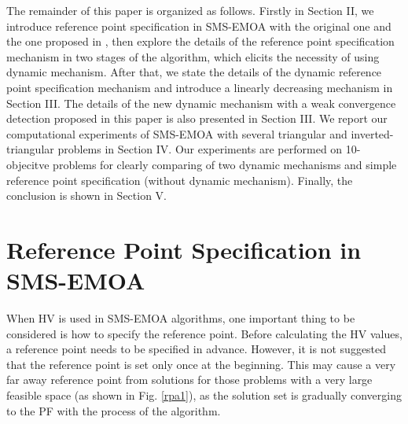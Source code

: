 \documentclass[conference]{IEEEtran}
\begin{document}
The remainder of this paper is organized as follows. 
Firstly in Section II, we introduce reference point specification in SMS-EMOA with
the original one and the one proposed in \cite{hisao:RPhowtoSpecify},
then explore the details of the reference point specification mechanism in two stages of the algorithm, 
which elicits the necessity of using dynamic mechanism.
After that, we state the details of the dynamic reference point specification mechanism and introduce 
a linearly decreasing mechanism in Section III. 
The details of the new dynamic mechanism with a weak convergence detection proposed in this paper is also presented in Section III. 
We report our computational experiments of SMS-EMOA 
with several triangular and inverted-triangular problems in Section IV. Our experiments are performed on
10-objecitve problems for clearly comparing of two dynamic mechanisms and 
simple reference point specification (without dynamic mechanism). Finally, the conclusion is shown in Section V.

%
%
\section{Reference Point Specification in SMS-EMOA}
When HV is used in SMS-EMOA algorithms, 
one important thing to be considered is how to specify the reference point.
Before calculating the HV values, a reference point needs to be specified in advance.
However, it is not suggested that the reference point is set only once at the beginning. 
This may cause a very far away reference point from solutions
for those problems with a very large feasible space (as shown in Fig. \ref{rpa1}),
as the solution set is gradually converging to the PF
with the process of the algorithm. 
\end{document}
